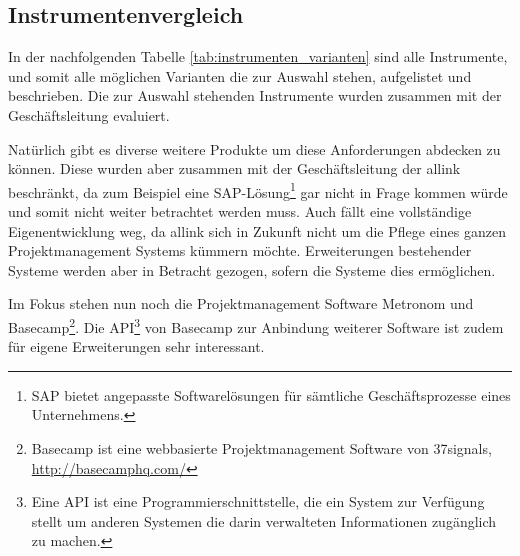 \subsection{Instrumentenvergleich}
In der nachfolgenden Tabelle \ref{tab:instrumenten_varianten} sind alle
Instrumente, und somit alle möglichen Varianten die zur Auswahl stehen, aufgelistet 
und beschrieben. Die zur Auswahl stehenden Instrumente wurden zusammen mit der
Geschäftsleitung evaluiert.

Natürlich gibt es diverse weitere Produkte um diese
Anforderungen abdecken zu können. Diese wurden aber zusammen mit der Geschäftsleitung
der allink beschränkt, da zum Beispiel eine SAP-Lösung\footnote{SAP bietet angepasste
Softwarelösungen für sämtliche Geschäftsprozesse eines Unternehmens.} gar 
nicht in Frage kommen würde und somit nicht weiter betrachtet werden muss.
Auch fällt eine vollständige Eigenentwicklung weg, da allink sich in Zukunft nicht
um die Pflege eines ganzen Projektmanagement Systems kümmern möchte. Erweiterungen
bestehender Systeme werden aber in Betracht gezogen, sofern die Systeme dies
ermöglichen.

\clearpage

Im Fokus stehen nun noch die Projektmanagement Software Metronom und Basecamp\footnote{Basecamp
ist eine webbasierte Projektmanagement Software von 37signals, \url{http://basecamphq.com/}}.
Die API\footnote{Eine API ist eine Programmierschnittstelle, die ein System zur Verfügung 
stellt um anderen Systemen die darin verwalteten Informationen zugänglich zu machen.} 
von Basecamp zur Anbindung weiterer Software ist zudem für eigene Erweiterungen 
sehr interessant.

